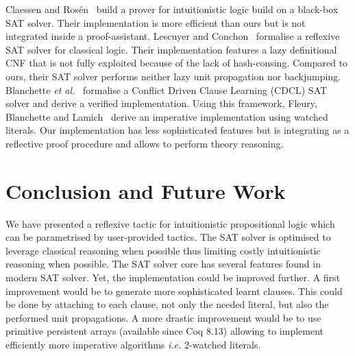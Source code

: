 \documentclass[utf8,a4paper,UKenglish,cleveref, autoref, thm-restate]{lipics-v2019}
\begin{document}
Claessen and Ros{\'{e}}n~\cite{ClaessenR15} build a prover for
intuitionistic logic build on a black-box SAT solver. Their
implementation is more efficient than ours but is not integrated
inside a proof-assistant. 
% 
Lescuyer and
Conchon~\cite{lescuyer08tphol,LescuyerC09} formalise a reflexive SAT
solver for classical logic. Their implementation features a lazy
definitional CNF that is not fully exploited because of the lack of
hash-consing. Compared to ours, their SAT solver performs neither lazy
unit propagation nor backjumping.
%
Blanchette \emph{et al.}~\cite{BlanchetteFLW18} formalise a Conflict
Driven Clause Learning (CDCL) SAT solver and derive a verified
implementation. Using this framework, Fleury, Blanchette and
Lamich~\cite{FleuryBL18} derive an imperative implementation using
watched literals. Our implementation has less sophisticated features
but is integrating as a reflective proof procedure and allows to
perform theory reasoning.



\section{Conclusion and Future Work}
\label{sec:conclusion}

We have presented  a reflexive tactic for intuitionistic
propositional logic which can be parametrised by user-provided tactics.
%
The SAT solver is optimised to leverage classical reasoning when
possible thus limiting costly intuitionistic reasoning when possible.
%
The SAT solver
core has several features found in modern SAT solver. Yet, the
implementation could be improved further. A first improvement would be
to generate more sophisticated learnt clauses. This could be done
by attaching to each clause, not only the needed literal, but also the
performed unit propagations. A more drastic improvement would be to use
primitive persistent arrays (available since Coq 8.13) allowing to
implement efficiently more imperative algorithms \emph{i.e.}
2-watched literals.





\end{document}
